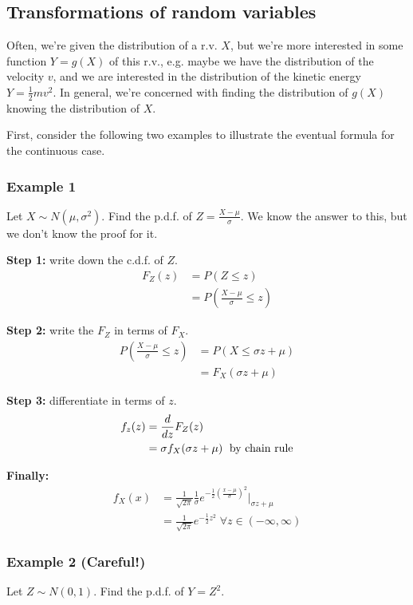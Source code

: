 \documentclass[12pt]{article}
\begin{document}
\subsection{Transformations of random variables}
Often, we're given the distribution of a r.v. $X$, but we're more interested in some function $Y = g(X)$ of this r.v., e.g. maybe we have the distribution of the velocity $v$, and we are interested in the distribution of the kinetic energy $Y = \frac{1}{2} m v^2$. In general, we're concerned with finding the distribution of $g(X)$ knowing the distribution of $X$. 

First, consider the following two examples to illustrate the eventual formula for the continuous case. 

\subsubsection{Example 1}
Let $X \sim N(\mu, \sigma^2)$. Find the p.d.f. of $Z = \frac{X - \mu}{\sigma}$. We know the answer to this, but we don't know the proof for it.

\textbf{Step 1:} write down the c.d.f. of $Z$.
\begin{align*}
    F_Z (z) &= P(Z \leq z) \\
        &= P( \frac{X - \mu}{\sigma} \leq z)
\end{align*}

\textbf{Step 2:} write the $F_Z$ in terms of $F_X$.
\begin{align*} 
    P(\frac{X - \mu}{\sigma} \leq z) &= P(X \leq \sigma z + \mu) \\
        &= F_X (\sigma z + \mu)
\end{align*}

\textbf{Step 3:} differentiate in terms of $z$.
\begin{align*}
    f_z (z) &= \frac{d}{dz} F_Z (z) \\
        &= \sigma f_X (\sigma z + \mu) \; \textnormal{ by chain rule}
\end{align*}

\textbf{Finally:} 
\begin{align*}
    f_X (x) &= \frac{1}{\sqrt{2\pi}} \frac{1}{\sigma} e^{-\frac{1}{2} (\frac{x-\mu}{\sigma})^2} \Big|_{\sigma z + \mu} \\
        &= \frac{1}{\sqrt{2\pi}} e^{-\frac{1}{2} z^2} \; \forall z \in (-\infty, \infty)
\end{align*}

\subsubsection{Example 2 (Careful!)}
Let $Z \sim N(0,1)$. Find the p.d.f. of $Y=Z^2$.
\end{document}
